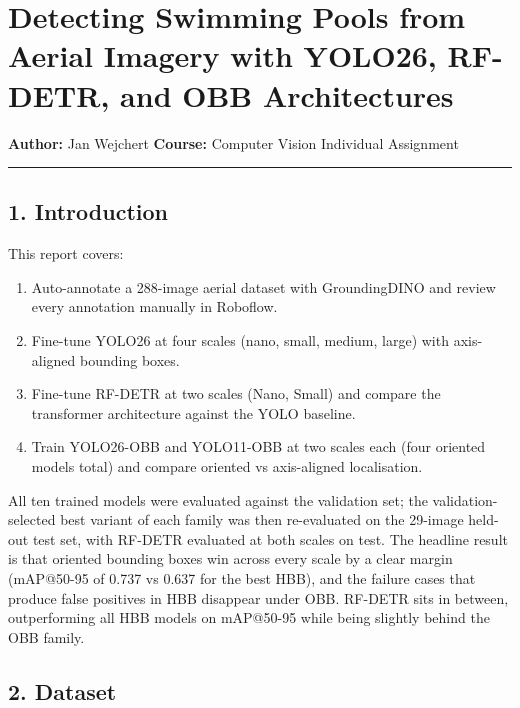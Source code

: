 \documentclass[11pt
]{article}
\author{}
\date{}
\providecommand{\tightlist}{%
  \setlength{\itemsep}{0pt}\setlength{\parskip}{0pt}}
\begin{document}
\section{Detecting Swimming Pools from Aerial Imagery with YOLO26,
RF-DETR, and OBB
Architectures}\label{detecting-swimming-pools-from-aerial-imagery-with-yolo26-rf-detr-and-obb-architectures}

\noindent\textbf{Author:} Jan Wejchert \hfill \textbf{Course:} Computer Vision Individual Assignment

\begin{center}\rule{0.5\linewidth}{0.5pt}\end{center}

\subsection{1. Introduction}\label{introduction}

This report covers:

\begin{enumerate}
\def\labelenumi{\arabic{enumi}.}
\tightlist
\item
  Auto-annotate a 288-image aerial dataset with GroundingDINO and review
  every annotation manually in Roboflow.
\item
  Fine-tune YOLO26 at four scales (nano, small, medium, large) with
  axis-aligned bounding boxes.
\item
  Fine-tune RF-DETR at two scales (Nano, Small) and compare the
  transformer architecture against the YOLO baseline.
\item
  Train YOLO26-OBB and YOLO11-OBB at two scales each (four oriented
  models total) and compare oriented vs axis-aligned localisation.
\end{enumerate}

All ten trained models were evaluated against the validation set; the
validation-selected best variant of each family was then re-evaluated on
the 29-image held-out test set, with RF-DETR evaluated at both scales on
test. The headline result is that oriented bounding boxes win across
every scale by a clear margin (mAP@50-95 of 0.737 vs 0.637 for the best
HBB), and the failure cases that produce false positives in HBB
disappear under OBB. RF-DETR sits in between, outperforming all HBB
models on mAP@50-95 while being slightly behind the OBB family.

\subsection{2. Dataset}\label{dataset}
\end{document}
